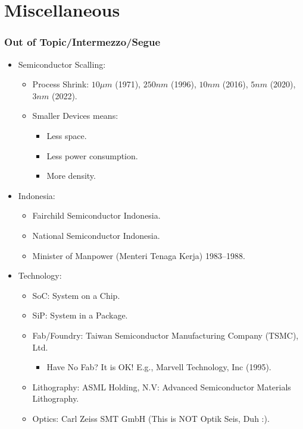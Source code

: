 \documentclass[aspectratio=169, xcolor=table, notheorems, hyperref={pdfpagelabels=false}]{beamer}
\begin{document}
\section{Miscellaneous}
\begin{frame}[fragile]
\frametitle{Out of Topic/Intermezzo/Segue}
\begin{itemize}
\item Semiconductor Scalling:
\begin{itemize}
\item Process Shrink: $10 \mu{}m$ (1971), $250 nm$ (1996), $10 nm$ (2016), $5 nm$ (2020), $3 nm$ (2022).
\item Smaller Devices means:
\begin{itemize}
\item Less space.
\item Less power consumption.
\item More density.
\end{itemize}
\end{itemize}
\item Indonesia:
\begin{itemize}
\item Fairchild Semiconductor Indonesia.
\item National Semiconductor Indonesia.
\item Minister of Manpower (Menteri Tenaga Kerja) 1983–1988.
\end{itemize}
\item Technology:
\begin{itemize}
\item SoC: System on a Chip.
\item SiP: System in a Package.
\item Fab/Foundry: Taiwan Semiconductor Manufacturing Company (TSMC), Ltd.
\begin{itemize}
\item Have No Fab? It is OK! E.g., Marvell Technology, Inc (1995).
\end{itemize}
\item Lithography: ASML Holding, N.V: Advanced Semiconductor Materials Lithography.
\item Optics: Carl Zeiss SMT GmbH (This is NOT Optik Seis, Duh :).
\end{itemize}
\end{itemize}
\end{frame}
\end{document}
